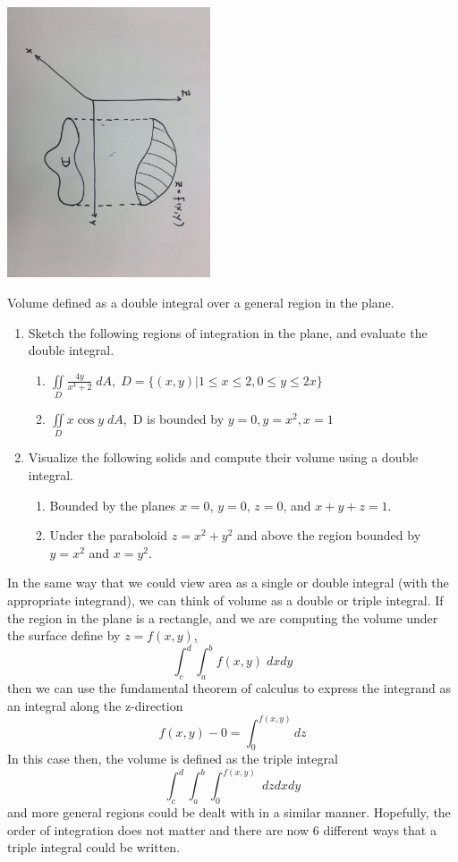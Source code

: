 \documentclass{tufte-handout}
\begin{document}
\begin{marginfigure}
\includegraphics[width=6cm]{figs/volumegeneral}
\caption{Volume defined as a double integral over a general region in the plane.}
\end{marginfigure}

\begin{enumerate}[resume]
\item Sketch the following regions of integration in the plane, and evaluate the double integral.
\begin{enumerate}
\item $\iint\limits_D  \frac{4y}{x^3+2} \; dA, \; D = \{(x,y) | 1 \le x \le 2, 0 \le y \le 2x\} $
\item $\iint\limits_D x \cos y \; dA, $ \; D is bounded by $y=0, y = x^2, x = 1$ 
\end{enumerate}
\item Visualize the following solids and compute their volume using a double integral.
\begin{enumerate}
\item Bounded by the planes $x = 0$, $y=0$, $z=0$, and $x+y+z=1$.
\item Under the paraboloid $z = x^2 + y^2$ and above the region bounded by $y=x^2$ and $x=y^2$.
\end{enumerate}
\end{enumerate}

In the same way that we could view area as a single or double integral (with the appropriate integrand), we can think of volume as a double or triple integral. If the region in the plane is a rectangle, and we are computing the volume under the surface define by $z=f(x,y)$,
\[\int_c^d \int_a^b f(x,y) \; dx dy \]
then we can use the fundamental theorem of calculus to express the integrand as an integral along the z-direction
\[f(x,y) - 0 = \int_0^{f(x,y)} dz \]
In this case then, the volume is defined as the triple integral
\[\int_c^d \int_a^b \int_0^{f(x,y)}  \; dz dx dy\]
and more general regions could be dealt with in a similar manner. Hopefully, the order of integration does not matter and there are now 6 different ways that a triple integral could be written.
\end{document}
